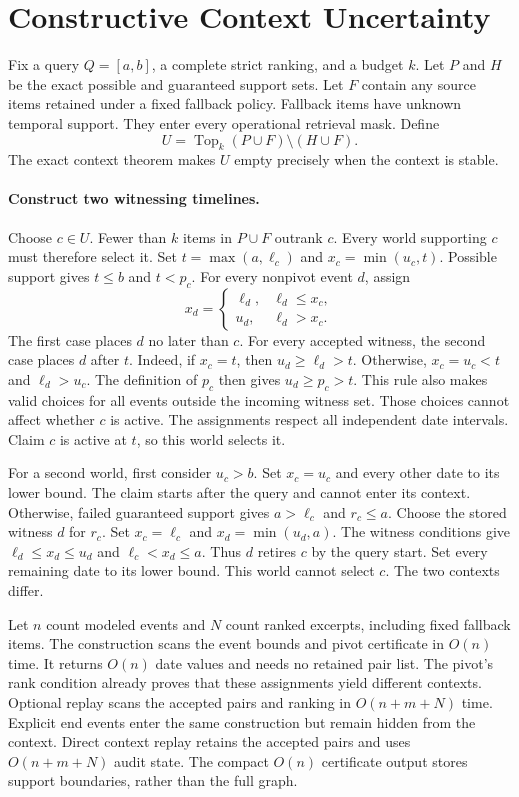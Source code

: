 \section{Constructive Context Uncertainty}
\label{app:refinement}

Fix a query $Q=[a,b]$, a complete strict ranking, and a budget $k$.
Let $P$ and $H$ be the exact possible and guaranteed support sets.
Let $F$ contain any source items retained under a fixed fallback policy.
Fallback items have unknown temporal support.
They enter every operational retrieval mask.
Define
\[
 U=\operatorname{Top}_k(P\cup F)\setminus(H\cup F).
\]
The exact context theorem makes $U$ empty precisely when the context is stable.

\paragraph{Construct two witnessing timelines.}
Choose $c\in U$.
Fewer than $k$ items in $P\cup F$ outrank $c$.
Every world supporting $c$ must therefore select it.
Set $t=\max(a,\ell_c)$ and $x_c=\min(u_c,t)$.
Possible support gives $t\le b$ and $t<p_c$.
For every nonpivot event $d$, assign
\[
 x_d=\begin{cases}
 \ell_d,&\ell_d\le x_c,\\
 u_d,&\ell_d>x_c.
 \end{cases}
\]
The first case places $d$ no later than $c$.
For every accepted witness, the second case places $d$ after $t$.
Indeed, if $x_c=t$, then $u_d\ge \ell_d>t$.
Otherwise, $x_c=u_c<t$ and $\ell_d>u_c$.
The definition of $p_c$ then gives $u_d\ge p_c>t$.
This rule also makes valid choices for all events outside the incoming witness set.
Those choices cannot affect whether $c$ is active.
The assignments respect all independent date intervals.
Claim $c$ is active at $t$, so this world selects it.

For a second world, first consider $u_c>b$.
Set $x_c=u_c$ and every other date to its lower bound.
The claim starts after the query and cannot enter its context.
Otherwise, failed guaranteed support gives $a>\ell_c$ and $r_c\le a$.
Choose the stored witness $d$ for $r_c$.
Set $x_c=\ell_c$ and $x_d=\min(u_d,a)$.
The witness conditions give $\ell_d\le x_d\le u_d$ and $\ell_c<x_d\le a$.
Thus $d$ retires $c$ by the query start.
Set every remaining date to its lower bound.
This world cannot select $c$.
The two contexts differ.

Let $n$ count modeled events and $N$ count ranked excerpts, including fixed fallback items.
The construction scans the event bounds and pivot certificate in $O(n)$ time.
It returns $O(n)$ date values and needs no retained pair list.
The pivot's rank condition already proves that these assignments yield different contexts.
Optional replay scans the accepted pairs and ranking in $O(n+m+N)$ time.
Explicit end events enter the same construction but remain hidden from the context.
Direct context replay retains the accepted pairs and uses $O(n+m+N)$ audit state.
The compact $O(n)$ certificate output stores support boundaries, rather than the full graph.

